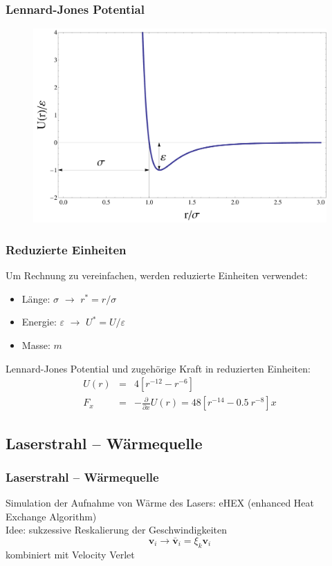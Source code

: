 \documentclass[handout]{beamer}
\begin{document}
\begin{frame}
\frametitle{Lennard-Jones Potential}
\begin{center}
\begin{figure}
\includegraphics[scale=0.3]{../images/LJ-2.pdf}
\end{figure}
\end{center}
\end{frame}

\begin{frame}
\frametitle{Reduzierte Einheiten}
Um Rechnung zu vereinfachen, werden reduzierte Einheiten verwendet:
\begin{itemize}
\item Länge: $\sigma$ $\rightarrow$ $r^* = r/\sigma$
\item Energie: $\varepsilon$ $\rightarrow$ $U^* = U/\varepsilon$
\item Masse: $m$
\end{itemize}
Lennard-Jones Potential und zugehörige Kraft in reduzierten Einheiten:
\begin{eqnarray}
    U(r) &=& 4\left[{r}^{-12} - {r}^{-6}\right] \\
    F_{x} &=& -\frac{\partial}{\partial x} U(r) = 48 \left[r^{-14} - 0.5 \ r^{-8}\right] x
\end{eqnarray}
\end{frame}



\subsection{Laserstrahl -- Wärmequelle}
\begin{frame}
\frametitle{Laserstrahl -- Wärmequelle}
Simulation der Aufnahme von Wärme des Lasers: eHEX (enhanced Heat Exchange Algorithm)\\
Idee: sukzessive Reskalierung der Geschwindigkeiten 
\begin{equation}
    \mathbf{v}_i \rightarrow \mathbf{\bar{v}}_i = \xi_k \mathbf{v}_i
\end{equation}
kombiniert mit Velocity Verlet

\end{frame}
\end{document}
